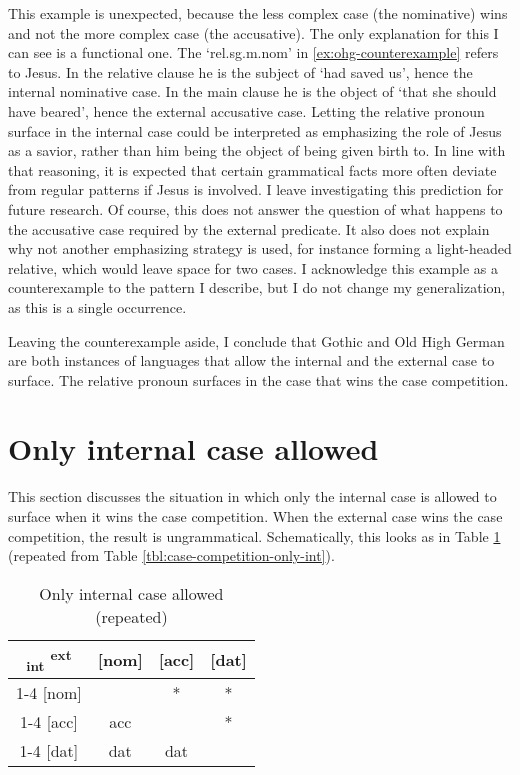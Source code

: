 This example is unexpected, because the less complex case (the nominative) wins and not the more complex case (the accusative).
The only explanation for this I can see is a functional one. The  `\ac{rel}.\ac{sg}.\ac{m}.\ac{nom}' in \ref{ex:ohg-counterexample} refers to Jesus. In the relative clause he is the subject of  `had saved us', hence the internal nominative case. In the main clause he is the object of  `that she should have beared', hence the external accusative case.
Letting the relative pronoun surface in the internal case could be interpreted as emphasizing the role of Jesus as a savior, rather than him being the object of being given birth to. In line with that reasoning, it is expected that certain grammatical facts more often deviate from regular patterns if Jesus is involved. I leave investigating this prediction for future research.
Of course, this does not answer the question of what happens to the accusative case required by the external predicate. It also does not explain why not another emphasizing strategy is used, for instance forming a light-headed relative, which would leave space for two cases.
I acknowledge this example as a counterexample to the pattern I describe, but I do not change my generalization, as this is a single occurrence.

Leaving the counterexample aside, I conclude that Gothic and Old High German are both instances of languages that allow the internal and the external case to surface. The relative pronoun surfaces in the case that wins the case competition.


\section{Only internal case allowed}\label{sec:pattern-ii}

This section discusses the situation in which only the internal case is allowed to surface when it wins the case competition. When the external case wins the case competition, the result is ungrammatical. Schematically, this looks as in Table \ref{tbl:case-competition-only-int-repeated} (repeated from Table \ref{tbl:case-competition-only-int}).

\begin{table}[H]
  \center
  \caption{Only internal case allowed (repeated)}
  \begin{tabular}{c|c|c|c}
    \toprule
    \textsubscript{\ac{int}} \textsuperscript{\ac{ext}}
           & [\ac{nom}]
           & [\ac{acc}]
           & [\ac{dat}]
           \\ \cmidrule{1-4}
       [\ac{nom}]
           & \xcancel{\phantom{xx}}
           & *
           & *
           \\ \cmidrule{1-4}
       [\ac{acc}]
           & \ac{acc}
           & \xcancel{\phantom{xx}}
           & *
           \\ \cmidrule{1-4}
       [\ac{dat}]
           & \ac{dat}
           & \ac{dat}
           & \xcancel{\phantom{xx}}
           \\
     \bottomrule
  \end{tabular}
    \label{tbl:case-competition-only-int-repeated}
\end{table}

